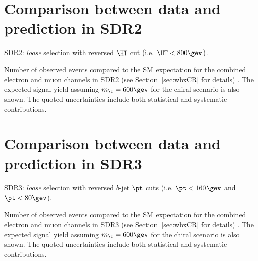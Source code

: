 \clearpage

%


\clearpage

\section{Comparison between data and prediction in SDR2}
\label{sec:DataMC_CR1}

SDR2: {\sl loose} selection with reversed $\HT$ cut (i.e. $\HT<800\gev$).

\begin{table}[h!]
\begin{center}

\caption{\small{Number of observed events compared to the SM expectation for
the combined electron and muon channels in SDR2 (see Section~\ref{sec:wbxCR} for details) . 
The expected signal yield assuming $m_{\T}=600\gev$ for the chiral scenario is also shown. 
The quoted uncertainties include both statistical and systematic contributions.}}
\label{tab:CR1_1W_evtable}
\end{center}
\end{table}

\clearpage

%


\clearpage

\section{Comparison between data and prediction in SDR3}
\label{sec:DataMC_CR2}

SDR3: {\sl loose} selection with reversed $b$-jet $\pt$ cuts (i.e. $\pt < 160\gev$ and $\pt < 80\gev$).

\begin{table}[h!]
\begin{center}

\caption{\small{Number of observed events compared to the SM expectation for
the combined electron and muon channels in SDR3 (see Section~\ref{sec:wbxCR} for details) . 
The expected signal yield assuming $m_{\T}=600\gev$ for the chiral scenario is also shown. 
The quoted uncertainties include both statistical and systematic contributions.}}
\label{tab:CR2_1W_evtable}
\end{center}
\end{table}

